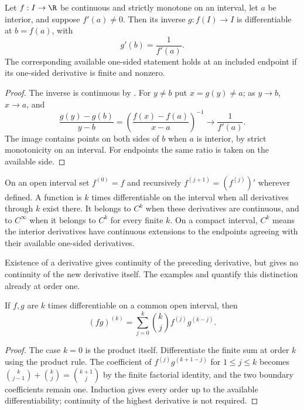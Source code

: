 \begin{theorem}
Let $f:I\to\R$ be continuous and strictly monotone on an interval, let $a$ be interior, and suppose $f'(a)\ne0$. Then its inverse $g:f(I)\to I$ is differentiable at $b=f(a)$, with
\[ g'(b)=\frac1{f'(a)}. \]
The corresponding available one-sided statement holds at an included endpoint if its one-sided derivative is finite and nonzero.
\end{theorem}
\begin{proof}
The inverse is continuous by . For $y\ne b$ put $x=g(y)\ne a$; as $y\to b$, $x\to a$, and
\[ \frac{g(y)-g(b)}{y-b}=\left(\frac{f(x)-f(a)}{x-a}\right)^{-1}\to\frac1{f'(a)}. \]
The image contains points on both sides of $b$ when $a$ is interior, by strict monotonicity on an interval. For endpoints the same ratio is taken on the available side.
\end{proof}

\begin{definition}
On an open interval set $f^{(0)}=f$ and recursively $f^{(j+1)}=(f^{(j)})'$ wherever defined. A function is $k$ times differentiable on the interval when all derivatives through $k$ exist there. It belongs to $C^k$ when these derivatives are continuous, and to $C^\infty$ when it belongs to $C^k$ for every finite $k$. On a compact interval, $C^k$ means the interior derivatives have continuous extensions to the endpoints agreeing with their available one-sided derivatives.
\end{definition}
Existence of a derivative gives continuity of the preceding derivative, but gives no continuity of the new derivative itself. The examples  and  quantify this distinction already at order one.

\begin{theorem}
If $f,g$ are $k$ times differentiable on a common open interval, then
\[ (fg)^{(k)}=\sum_{j=0}^k\binom kj f^{(j)}g^{(k-j)}. \]
\end{theorem}
\begin{proof}
The case $k=0$ is the product itself. Differentiate the finite sum at order $k$ using the product rule. The coefficient of $f^{(j)}g^{(k+1-j)}$ for $1\le j\le k$ becomes $\binom{k}{j-1}+\binom{k}{j}=\binom{k+1}{j}$ by the finite factorial identity, and the two boundary coefficients remain one. Induction gives every order up to the available differentiability; continuity of the highest derivative is not required.
\end{proof}

